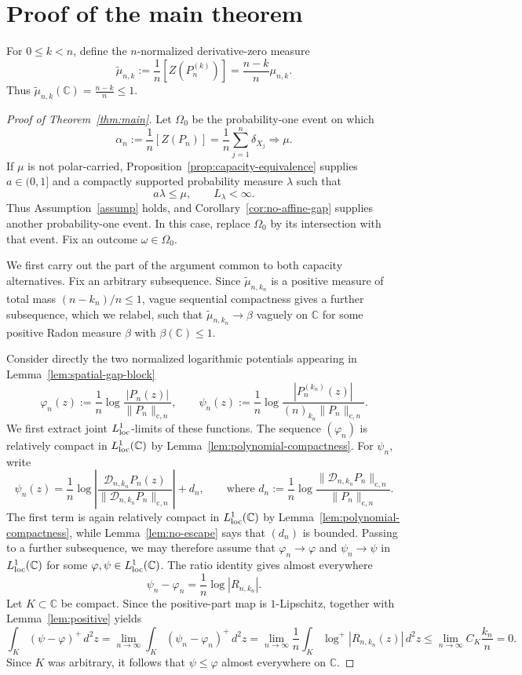 \documentclass[10pt,reqno]{amsart}
\theoremstyle{remark}
\newcommand{\C}{\mathbb C}
\newcommand{\logp}{\log^+}
\newcommand{\weak}{\Rightarrow}
\begin{document}
\section{Proof of the main theorem}\label{sec:main-thm}
For $0\le k<n$, define the $n$-normalized derivative-zero measure
\[\widetilde\mu_{n,k}:=\frac{1}{n}[Z(P_n^{(k)})]=\frac{n-k}{n}\mu_{n,k}.\]
Thus $\widetilde\mu_{n,k}(\C)=\frac{n-k}{n}\le 1$.
\begin{proof}[Proof of Theorem~\ref{thm:main}]
    Let $\Omega_0$ be the probability-one event on which
    \[\alpha_n:=\frac{1}{n}[Z(P_n)]=\frac{1}{n}\sum_{j=1}^n\delta_{X_j} \weak\mu.\]
    If $\mu$ is not polar-carried, Proposition~\ref{prop:capacity-equivalence} supplies $a\in(0,1]$ and a compactly supported probability measure $\lambda$ such that
    \[a\lambda\le\mu,\qquad L_\lambda<\infty.\]
    Thus Assumption~\ref{assump} holds, and Corollary~\ref{cor:no-affine-gap} supplies another probability-one event. In this case, replace $\Omega_0$ by its intersection with that event. Fix an outcome $\omega\in\Omega_0$.
    
    We first carry out the part of the argument common to both capacity alternatives. Fix an arbitrary subsequence. Since $\tilde\mu_{n,k_n}$ is a positive measure of total mass $(n-k_n)/n\le 1$, vague sequential compactness gives a further subsequence, which we relabel, such that $\tilde\mu_{n,k_n}\to \beta$ vaguely on $\C$ for some positive Radon measure $\beta$ with $\beta(\C)\le 1$. 

    Consider directly the two normalized logarithmic potentials appearing in Lemma~\ref{lem:spatial-gap-block}
    \[\varphi_n(z):=\frac{1}{n}\log\frac{|P_n(z)|}{\|P_n\|_{\mathrm{c},n}},\qquad \psi_n(z):=\frac{1}{n}\log\frac{|P^{(k_n)}_n(z)|}{(n)_{k_n}\|P_n\|_{\mathrm{c},n}}.\]
    We first extract joint $L_{\rm loc}^1$-limits of these functions. The sequence $(\varphi_n)$ is relatively compact in $L_{\rm loc}^1(\C)$ by Lemma~\ref{lem:polynomial-compactness}. For $\psi_n$, write 
    \[\psi_n(z)=\frac{1}{n}\log\left|\frac{\mathcal{D}_{n,k_n}P_n(z)}{\|\mathcal{D}_{n,k_n}P_n\|_{\mathrm{c},n}}\right|+d_n,\qquad\text{where }d_n:=\frac{1}{n}\log\frac{\|\mathcal{D}_{n,k_n}P_n\|_{\mathrm{c},n}}{\|P_n\|_{\mathrm{c},n}}.\]
    The first term is again relatively compact in $L_{\rm loc}^1(\C)$ by Lemma~\ref{lem:polynomial-compactness}, while Lemma~\ref{lem:no-escape} says that $(d_n)$ is bounded. Passing to a further subsequence, we may therefore assume that $\varphi_n\to \varphi$ and $\psi_n\to \psi$ in $L_{\rm loc}^1(\C)$ for some $\varphi,\psi\in L_{\rm loc}^1(\C)$. The ratio identity gives almost everywhere \[\psi_n-\varphi_n=\frac{1}{n}\log|R_{n,k_n}|.\]
    Let $K\subset \C$ be compact. Since the positive-part map is $1$-Lipschitz, together with Lemma~\ref{lem:positive} yields
    \[\int_K(\psi-\varphi)^+\,d^2z
    =\lim_{n\to\infty}\int_K(\psi_n-\varphi_n)^+\,d^2z
    =\lim_{n\to\infty}\frac{1}{n}\int_K\logp|R_{n,k_n}(z)|\,d^2z
    \le \lim_{n\to\infty} C_K\frac{k_n}{n}=0.\]
    Since $K$ was arbitrary, it follows that $\psi\le \varphi$ almost everywhere on $\C$. 


\end{proof}
\end{document}
